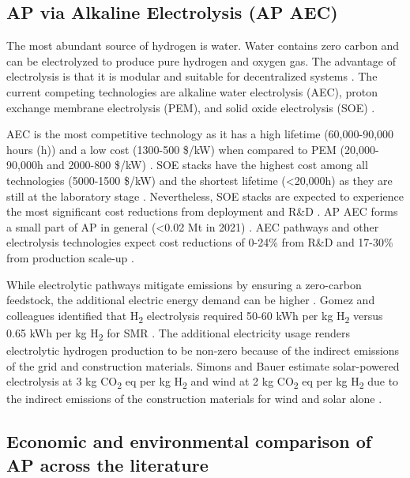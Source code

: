\documentclass{article}
\begin{document}
\subsection{AP via Alkaline Electrolysis (AP AEC)}

The most abundant source of hydrogen is water. Water contains zero carbon and can be electrolyzed to produce pure hydrogen and oxygen gas. The advantage of electrolysis is that it is modular and suitable for decentralized systems \cite{Sousa2022, Bohm2020}. The current competing technologies are alkaline water electrolysis (AEC), proton exchange membrane electrolysis (PEM), and solid oxide electrolysis (SOE) \cite{Bohm2020, Santos2017, Proost2017, Schmidt2017}.

AEC is the most competitive technology as it has a high lifetime (60,000-90,000 hours (h)) and a low cost (1300-500 \$\slash kW) when compared to PEM (20,000-90,000h and 2000-800 \$\slash kW) \cite{Schmidt2017}. SOE stacks have the highest cost among all technologies (5000-1500 \$\slash kW) and the shortest lifetime (<20,000h) as they are still at the laboratory stage \cite{Schmidt2017}. Nevertheless, SOE stacks are expected to experience the most significant cost reductions from deployment and R\&D \cite{Schmidt2017, Lee2021}. AP AEC forms a small part of AP in general (<0.02 Mt in 2021) \cite{Bohm2020, IRENA2022}. AEC pathways and other electrolysis technologies expect cost reductions of 0-24\% from R\&D and 17-30\% from production scale-up \cite{Schmidt2017}.

While electrolytic pathways mitigate emissions by ensuring a zero-carbon feedstock, the additional electric energy demand can be higher \cite{Singh2022}. Gomez and colleagues identified that H\textsubscript{2} electrolysis required 50-60 kWh per kg H\textsubscript{2} versus 0.65 kWh per kg H\textsubscript{2} for SMR \cite{Gomez2020, LEWIS2022}. The additional electricity usage renders electrolytic hydrogen production to be non-zero because of the indirect emissions of the grid and construction materials. Simons and Bauer estimate solar-powered electrolysis at 3 kg CO\textsubscript{2} eq per kg H\textsubscript{2} and wind at 2 kg CO\textsubscript{2} eq per kg H\textsubscript{2} due to the indirect emissions of the construction materials for wind and solar alone \cite{Simons2011}.

\subsection{Economic and environmental comparison of AP across the literature}
\end{document}
